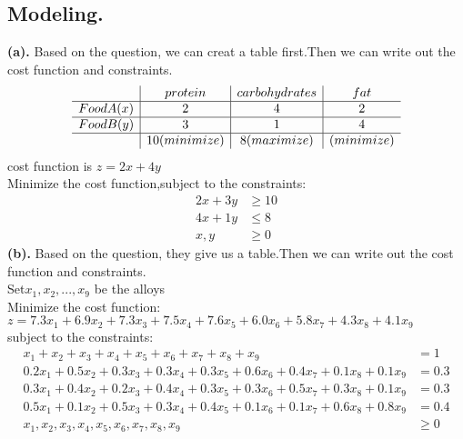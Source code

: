 \documentclass[11pt]{article}
\begin{document}
\subsection{Modeling.}
\textbf{(a).}
Based on the question, we can creat a table first.Then we can write out the cost function and constraints.
\[
\begin{array}{c|c|c|c}
&protein&carbohydrates&fat\\\hline
Food A(x)&2&4&2\\\hline
Food B(y)&3&1&4\\\hline
&10(minimize)&8(maximize)&(minimize)
\end{array}
\]
cost function is $z=2x+4y$\\
Minimize the cost function,subject to the constraints:\\
\begin{align*}
    2x+3y&\geq 10\\
    4x+1y&\leq 8\\
    x,y&\geq 0
\end{align*}
\newpage
\textbf{(b).}
Based on the question, they give us a table.Then we can write out the cost function and constraints.\\
Set$x_1,x_2,...,x_9$ be the alloys\\Minimize the cost function:
$z=7.3x_1+6.9x_2+7.3x_3+7.5x_4+7.6x_5+6.0x_6+5.8x_7+4.3x_8+4.1x_9$\\
subject to the constraints:\\
\begin{align*}
    x_1+x_2+x_3+x_4+x_5+x_6+x_7+x_8+x_9&= 1\\
    0.2x_1+0.5x_2+0.3x_3+0.3x_4+0.3x_5+0.6x_6+0.4x_7+0.1x_8+0.1x_9&= 0.3\\
    0.3x_1+0.4x_2+0.2x_3+0.4x_4+0.3x_5+0.3x_6+0.5x_7+0.3x_8+0.1x_9&= 0.3\\
    0.5x_1+0.1x_2+0.5x_3+0.3x_4+0.4x_5+0.1x_6+0.1x_7+0.6x_8+0.8x_9&= 0.4\\
    x_1,x_2,x_3,x_4,x_5,x_6,x_7,x_8,x_9&\geq 0
\end{align*}
\end{document}
